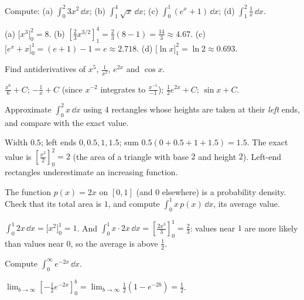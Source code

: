 \sectionexercises

\begin{exercise}
Compute: (a) $\int_0^2 3x^2\,\dd x$; (b) $\int_1^4\sqrt x\,\dd x$;
(c) $\int_0^1(e^x + 1)\,\dd x$; (d) $\int_1^2\frac1x\,\dd x$.
\end{exercise}
\begin{solution}
(a) $\bigl[x^3\bigr]_0^2 = 8$. (b) $\left[\tfrac23x^{3/2}\right]_1^4 =
\tfrac23(8 - 1) = \tfrac{14}{3} \approx 4.67$. (c) $\bigl[e^x + x\bigr]_0^1 =
(e + 1) - 1 = e \approx 2.718$. (d) $\bigl[\ln x\bigr]_1^2 = \ln2 \approx
0.693$.
\end{solution}

\begin{exercise}
Find antiderivatives of $x^5$, $\frac{1}{x^2}$, $e^{2x}$ and $\cos x$.
\end{exercise}
\begin{solution}
$\tfrac{x^6}{6} + C$; $-\tfrac1x + C$ (since $x^{-2}$ integrates to
$\tfrac{x^{-1}}{-1}$); $\tfrac12e^{2x} + C$; $\sin x + C$.
\end{solution}

\begin{exercise}
Approximate $\int_0^2 x\,\dd x$ using $4$ rectangles whose heights are taken at
their \emph{left} ends, and compare with the exact value.
\end{exercise}
\begin{solution}
Width $0.5$; left ends $0, 0.5, 1, 1.5$; sum $0.5(0 + 0.5 + 1 + 1.5) = 1.5$.
The exact value is $\left[\tfrac{x^2}{2}\right]_0^2 = 2$ (the area of a triangle
with base $2$ and height $2$). Left-end rectangles underestimate an increasing
function.
\end{solution}

\begin{exercise}
The function $p(x) = 2x$ on $[0, 1]$ (and $0$ elsewhere) is a probability
density. Check that its total area is $1$, and compute $\int_0^1 x\,p(x)\,\dd x$,
its average value.
\end{exercise}
\begin{solution}
$\int_0^1 2x\,\dd x = \bigl[x^2\bigr]_0^1 = 1$. And
$\int_0^1 x\cdot2x\,\dd x = \left[\tfrac{2x^3}{3}\right]_0^1 = \tfrac23$: values
near $1$ are more likely than values near $0$, so the average is above
$\tfrac12$.
\end{solution}

\begin{exercise}
Compute $\int_0^\infty e^{-2x}\,\dd x$.
\end{exercise}
\begin{solution}
$\lim_{b\to\infty}\left[-\tfrac12e^{-2x}\right]_0^b =
\lim_{b\to\infty}\tfrac12\left(1 - e^{-2b}\right) = \tfrac12$.
\end{solution}

